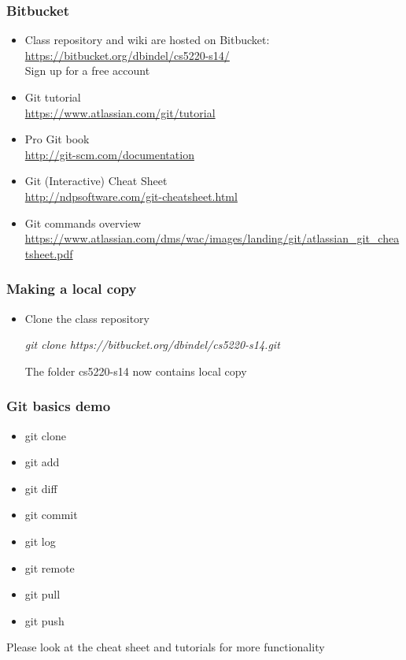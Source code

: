 \documentclass{beamer}
\begin{document}
\begin{frame}
  \frametitle{Bitbucket}

  \begin{itemize}
  \item Class repository and wiki are hosted on Bitbucket: \\
  \url{https://bitbucket.org/dbindel/cs5220-s14/} \\
  Sign up for a free account \\
  \item Git tutorial \\
  \url{https://www.atlassian.com/git/tutorial} \\
  \item Pro Git book \\
  \url{http://git-scm.com/documentation }\\
  \item Git (Interactive) Cheat Sheet  \\
  \url{http://ndpsoftware.com/git-cheatsheet.html} \\
  \item Git commands overview
  \url{https://www.atlassian.com/dms/wac/images/landing/git/atlassian\_git\_cheatsheet.pdf}
  \end{itemize}
\end{frame}


\begin{frame}
  \frametitle{Making a local copy}

  \begin{itemize}
  \item Clone the class repository
  \vspace{5mm}
  \begin{center}
    \it{git clone https://bitbucket.org/dbindel/cs5220-s14.git}
  \end{center}
  \vspace{5mm}
  The folder cs5220-s14 now contains local copy
  \end{itemize}

\end{frame}

\begin{frame}
  \frametitle{Git basics demo}

  \begin{itemize}
  \item git clone
  \item git add
  \item git diff
  \item git commit
  \item git log
  \item git remote
  \item git pull
  \item git push
  \end{itemize}
  \vspace{5mm}
  Please look at the cheat sheet and tutorials for more functionality

\end{frame}
\end{document}

